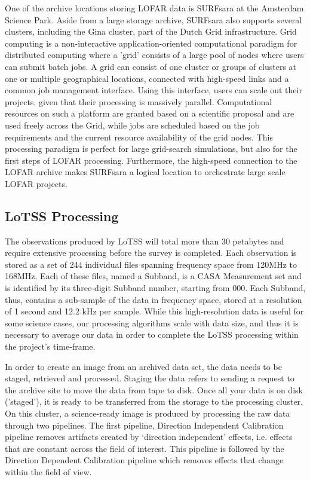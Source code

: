 One of the archive locations storing LOFAR data is SURFsara at the Amsterdam Science Park. Aside from a large storage archive, SURFsara also supports several clusters, including the Gina cluster, part of the Dutch Grid infrastructure. Grid computing is a non-interactive application-oriented computational paradigm for distributed computing where a 'grid' consists of a large pool of nodes where users can submit batch jobs. A grid can consist of one cluster or groups of clusters at one or multiple geographical locations, connected with high-speed links and a common job management interface. Using this interface, users can scale out their projects, given that their processing is massively parallel. Computational resources on such a platform are granted based on a scientific proposal and are used freely across the Grid, while jobs are scheduled based on the job requirements and the current resource availability of the grid nodes. This processing paradigm is perfect for large grid-search simulations, but also for the first steps of LOFAR processing. Furthermore, the high-speed connection to the LOFAR archive makes SURFsara a logical location to orchestrate large scale LOFAR projects.


\subsection{LoTSS Processing}

The observations produced by LoTSS will total more than 30 petabytes and require extensive processing before the survey is completed. Each observation is stored as a set of 244 individual files spanning frequency space from 120MHz to 168MHz. Each of these files, named a Subband, is a CASA Measurement set and is identified by its three-digit Subband number, starting from 000. Each Subband, thus, contains a sub-sample of the data in frequency space, stored at a resolution of 1 second and 12.2 kHz per sample. While this high-resolution data is useful for some science cases, our processing algorithms scale with data size, and thus it is necessary to average our data in order to complete the LoTSS processing within the project's time-frame. 

In order to create an image from an archived data set, the data needs to be staged, retrieved and processed. Staging the data refers to sending a request to the archive site to move the data from tape to disk. Once all your data is on disk ('staged'), it is ready to be transferred from the storage to the processing cluster. On this cluster, a science-ready image is produced by processing the raw data through two pipelines. The first pipeline, Direction Independent Calibration pipeline removes artifacts created by `direction independent' effects, i.e. effects that are constant across the field of interest. This pipeline is followed by the Direction Dependent Calibration pipeline which removes effects that change within the field of view.
 
